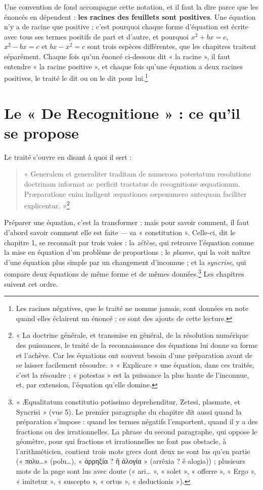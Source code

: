 \documentclass[11pt,a4paper]{article}
\begin{document}
Une convention de fond accompagne cette notation, et il faut la dire parce que
les énoncés en dépendent : \textbf{les racines des feuillets sont positives}.
Une équation n'y a de racine que positive ; c'est pourquoi chaque forme
d'équation est écrite avec tous ses termes positifs de part et d'autre, et
pourquoi $x^2 + bx = c$, $x^2 - bx = c$ et $bx - x^2 = c$ sont trois espèces
différentes, que les chapitres traitent séparément. Chaque fois qu'un énoncé
ci-dessous dit « la racine », il faut entendre « la racine positive », et
chaque fois qu'une équation a deux racines positives, le traité le dit ou on le
dit pour lui.\footnote{Les racines négatives, que le traité ne nomme jamais,
sont données en note quand elles éclairent un énoncé ; ce sont des ajouts de
cette lecture.}

\section*{Le « De Recognitione » : ce qu'il se propose}

Le traité s'ouvre en disant à quoi il sert :

\begin{quote}
« Generalem et generaliter traditam de numerosa potestatum resolutione
doctrinam informat ac perficit tractatus de recognitione æquationum.
Præparatione enim indigent æquationes sæpenumero antequam faciliter
explicentur. »\footnote{« La doctrine générale, et transmise en général, de la
résolution numérique des puissances, le traité de la reconnaissance des
équations lui donne sa forme et l'achève. Car les équations ont souvent besoin
d'une préparation avant de se laisser facilement résoudre. » « Explicare » une
équation, dans ces traités, c'est la résoudre ; « potestas » est la puissance la
plus haute de l'inconnue, et, par extension, l'équation qu'elle domine.}
\end{quote}

Préparer une équation, c'est la transformer ; mais pour savoir comment, il faut
d'abord savoir comment elle est faite — sa « constitution ». Celle-ci, dit le
chapitre 1, se reconnaît par trois voies : la \emph{zétèse}, qui retrouve
l'équation comme la mise en équation d'un problème de proportions ; le
\emph{plasme}, qui la voit naître d'une équation plus simple par un changement
d'inconnue ; et la \emph{syncrise}, qui compare deux équations de même forme et
de mêmes données.\footnote{« Æqualitatum constitutio potissimo deprehenditur,
Zetesi, plasmate, et Syncrisi » (vue 5). Le premier paragraphe du chapitre dit
aussi quand la préparation s'impose : quand les termes négatifs l'emportent,
quand il y a des fractions ou des irrationnelles. La phrase du second
paragraphe, qui oppose le géomètre, pour qui fractions et irrationnelles ne
font pas obstacle, à l'arithméticien, contient trois mots grecs dont deux ne
sont lus qu'en partie (« πολυ\ldots » (polu\ldots), « ἀρρηξία ? ἢ ἀλογία » (arrêxia ? ê alogia)) ; plusieurs mots
de la page sont lus avec doute (« ari\ldots{} », « solet », « offerre »,
« Ergo », « imitetur », « suscepto », « ortus », « deductionis »).} Les
chapitres suivent cet ordre.
\end{document}
